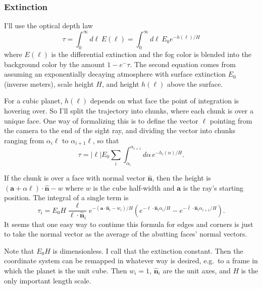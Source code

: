 \documentclass[11pt,twocolumn]{article}
\newcommand{\unit}[1]{\hat{\bm {#1}}}
\newcommand{\parens}[1]{\left(#1\right)}
\begin{document}
    \subsubsection{Extinction}
      I'll use the optical depth law
      \begin{equation}
        \tau = \int_0^\infty d\ell\, E(\ell) = \int_0^\infty d\ell\, E_0 e^{-h(\ell) / H}
      \end{equation}
      where $E(\ell)$ is the differential extinction and the fog color is blended into the background color by the amount $1 - e^-\tau$. The second equation comes from assuming an exponentially decaying atmosphere with surface extinction $E_0$ (inverse meters), scale height $H$, and height $h(\ell)$ above the surface.

      For a cubic planet, $h(\ell)$ depends on what face the point of integration is hovering over. So I'll split the trajectory into chunks, where each chunk is over a unique face. One way of formalizing this is to define the vector $\bm \ell$ pointing from the camera to the end of the sight ray, and dividing the vector into chunks ranging from $\alpha_i \bm \ell$ to $\alpha_{i+1} \bm \ell$, so that
      \begin{equation}
        \tau = |\ell| E_0 \sum_i \int_{\alpha_i}^{\alpha_{i+1}}d\alpha\, e^{-h_i(\alpha) / H}.
      \end{equation}

      If the chunk is over a face with normal vector $\unit n$, then the height is $(\bm a + \alpha \bm \ell) \cdot \unit n - w$ where $w$ is the cube half-width and $\bm a$ is the ray's starting position. The integral of a single term is
      \begin{equation}
        \tau_i = E_0H\frac{\ell}{\bm \ell \cdot \unit n_i} e^{-(\bm a \cdot \unit n_i - w_i) / H} \parens{e^{-\bm\ell \cdot \unit n_i \alpha_{i} / H} - e^{-\unit\ell \cdot \unit n_i \alpha_{i+1} / H}}.
      \end{equation}
      It seems that one easy way to continue this formula for edges and corners is just to take the normal vector as the average of the abutting faces' normal vectors.

      Note that $E_0H$ is dimensionless. I call that the extinction constant. Then the coordinate system can be remapped in whatever way is desired, e.g.~to a frame in which the planet is the unit cube. Then $w_i = 1$, $\unit n_i$ are the unit axes, and $H$ is the only important length scale.
    
\end{document}
